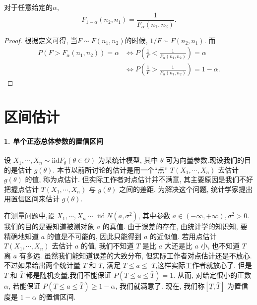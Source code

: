 \begin{corollary}
    对于任意给定的$\alpha$, 
    \[
        F_{1-\alpha}(n_2, n_1)=\frac{1}{F_\alpha(n_1, n_2)}.     
    \]
\end{corollary}

\begin{proof}
    根据定义可得, 当$F\sim F(n_1, n_2)$的时候, $1/F\sim F(n_2, n_1)$. 而
    \[
        \begin{aligned}
            P(F>F_\alpha(n_1, n_2))=\alpha &\iff P(\frac1F<\frac1{F_\alpha(n_1, n_2)})=\alpha \\
            &\iff P(\frac1F>\frac1{F_\alpha(n_1, n_2)})=1-\alpha .
        \end{aligned}
    \]
\end{proof}

\section{区间估计}


\paragraph{1. 单个正态总体参数的置信区间}
设 $X_1, \cdots, X_n \sim \mathrm{iid} F_\theta(\theta \in \Theta)$ 为某统计模型, 其中 $\theta$ 可为向量参数.现设我们的目的是估计 $g(\theta)$. 本节以前所讨论的估计是用一个``点'' $T\left(X_1, \cdots, X_n\right)$ 去估计 $g(\theta)$ 的值, 称为点估计. 但实际工作者对点估计并不满意, 其主要原因是我们不好把握点估计 $T\left(X_1, \cdots, X_n\right)$ 与 $g(\theta)$ 之间的差距. 为解决这个问题, 统计学家提出用置信区间来估计 $g(\theta)$. 

\begin{example}
    在测量问题中,设 $X_1, \cdots, X_n \sim \operatorname{iid} N\left(a, \sigma^2\right)$, 其中参数 $a \in(-\infty,+\infty), \sigma^2>0$. 我们的目的是要知道被测对象 $a$ 的真值. 由于误差的存在, 由统计学的知识知, 要精确地知道 $a$ 的值是不可能的, 因此只能得到 $a$ 的近似值. 若用点估计 $T\left(X_1, \cdots, X_n\right)$ 去估计 $a$ 的值, 我们不知道 $T$ 是比 $a$ 大还是比 $a$ 小, 也不知道 $T$ 离 $a$ 有多远. 虽然我们能知道误差的大致分布, 但实际工作者对点估计还是不放心. 不过如果给出两个统计量 $\underline T$ 和 $\bar{T}$, 满足 $\underline T \leq a \leq$ $\bar{T}$,这样实际工作者就放心了. 但是 $\underline{T}$ 和 $\bar{T}$ 都是随机变量,我们不能保证 $P(\underline{T} \leq a \leq \bar{T})=1$. 从而, 对给定很小的正数 $\alpha$, 若能保证 $P(\underline{T} \leq a \leq \bar T)\geq 1-\alpha $, 我们就满意了. 现在, 我们称$[\underline T, \bar{T}]$ 为置信度是 $1-\alpha$ 的置信区间.
\end{example}

